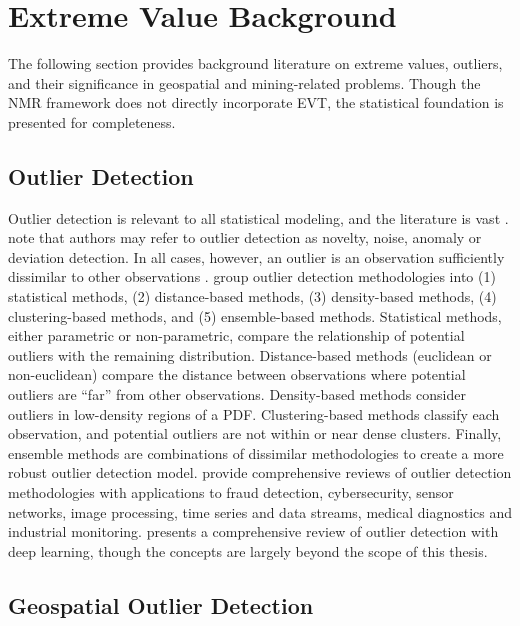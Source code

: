 \FloatBarrier
\section{Extreme Value Background}
\label{sec:01evtreview}

The following section provides background literature on extreme values, outliers, and their significance in geospatial and mining-related problems. Though the \gls{NMR} framework does not directly incorporate \gls{EVT}, the statistical foundation is presented for completeness.

\subsection{Outlier Detection}
\label{subsec:01outlier}

Outlier detection is relevant to all statistical modeling, and the literature is vast \citep{zimek2018there}. \cite{hodge2004survey} note that authors may refer to outlier detection as novelty, noise, anomaly or deviation detection. In all cases, however, an outlier is an observation sufficiently dissimilar to other observations \citep{barnett1984outliers}. \cite{wang2019progress} group outlier detection methodologies into (1) statistical methods, (2) distance-based methods, (3) density-based methods, (4) clustering-based methods, and (5) ensemble-based methods. Statistical methods, either parametric or non-parametric, compare the relationship of potential outliers with the remaining distribution. Distance-based methods (euclidean or non-euclidean) compare the distance between observations where potential outliers are ``far'' from other observations. Density-based methods consider outliers in low-density regions of a \gls{PDF}. Clustering-based methods classify each observation, and potential outliers are not within or near dense clusters. Finally, ensemble methods are combinations of dissimilar methodologies to create a more robust outlier detection model. \cite{hodge2004survey,wang2019progress,pimentel2014review,boukerche2021outlier} provide comprehensive reviews of outlier detection methodologies with applications to fraud detection, cybersecurity, sensor networks, image processing, time series and data streams, medical diagnostics and industrial monitoring. \cite{pang2022deep} presents a comprehensive review of outlier detection with deep learning, though the concepts are largely beyond the scope of this thesis.

\subsection{Geospatial Outlier Detection}
\label{subsec:01miningoutlier}

